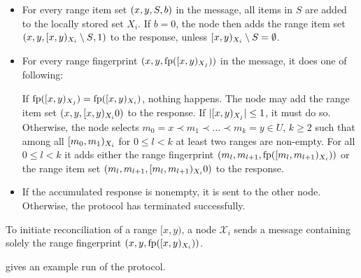 \begin{itemize}
  \item For every range item set $({x}, {y}, {S}, {b})$ in the message, all items in $S$ are added to the locally stored set $X_i$. If $b = 0$, the node then adds the range item set $({x}, {y}, {[{x},{y})_{X_i} \setminus S}, {1})$ to the response, unless $[{x},{y})_{X_i} \setminus S = \emptyset$.
  \item For every range fingerprint $({x}, {y}, {\operatorname{fp}([{x},{y})_{X_j})})$ in the message, it does one of following:
    \begin{caselist}
       \label{def-fingerprint-eq} If $\operatorname{fp}([{x},{y})_{X_j}) = \operatorname{fp}([{x},{y})_{X_i})$, nothing happens.
       \label{def-recursion-anchor} The node may add the range item set $({x}, {y}, [{x},{y})_{X_i}{0})$ to the response. If $|{[{x},{y})_{X_j}}| \leq 1$, it must do so.
      \case[Recurse] \label{def-recurse} Otherwise, the node selects $m_0 = x \prec m_1 \prec \ldots \prec m_k = y \in U$, $k \geq 2$ such that among all $[{m_0},{m_1})_{X_i}$ for  $0 \leq l < k$ at least two ranges are non-empty. For all $0 \leq l < k$ it adds either the range fingerprint $({m_l}, {m_{l + 1}}, {\operatorname{fp}([{m_l},{m_{l + 1}})_{X_i})})$ or the range item set $({m_l}, {m_{l + 1}}, [{m_l},{m_{l + 1}})_{X_i}{0})$ to the response.
    \end{caselist}
  \item If the accumulated response is nonempty, it is sent to the other node. Otherwise, the protocol has terminated successfully.
\end{itemize}

To initiate reconciliation of a range $[x, y)$, a node $\mathcal{X}_i$ sends a message containing solely the range fingerprint $({x}, {y}, {\operatorname{fp}([{x},{y})_{X_i})})$.

 gives an example run of the protocol.

